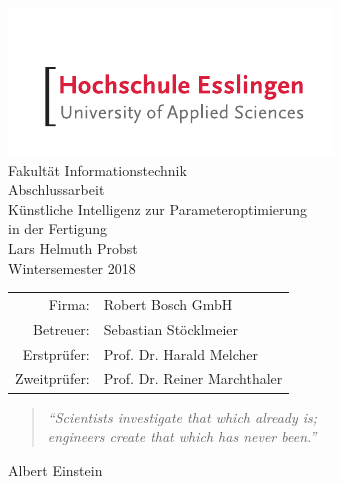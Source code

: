 

\usepackage[T1]{fontenc}
\usepackage[utf8]{inputenc}
\usepackage{graphicx}





\begin{titlepage}
\begin{center}
\includegraphics[scale=2.5]{images/he_logo.pdf}\\
\vspace{1cm} Fakultät Informationstechnik\\
\vspace{1.5cm} \Large Abschlussarbeit \\
\vspace{1.5cm} \Huge Künstliche Intelligenz zur Parameteroptimierung \\in der Fertigung\\
\vspace{1.5cm} \Large Lars Helmuth Probst\\\normalsize
\vspace{0.5cm} Wintersemester 2018\\\normalsize
\vfill{}
\begin{tabular}{rl}
Firma: & Robert Bosch GmbH\\[0.5cm]
Betreuer: & Sebastian Stöcklmeier\\[0.5cm]
Erstprüfer: & Prof. Dr. Harald Melcher\\[0.5cm]
Zweitprüfer: & Prof. Dr. Reiner Marchthaler\\
\end{tabular}
\end{center}
\end{titlepage}

\thispagestyle{empty}
\vspace*{2cm}
\begin{center}
\begin{minipage}{12cm}
\begin{center}
\end{center}
\end{minipage}

\vfill{}

\begin{minipage}{10cm}
\begin{quote}
\textit{"`Scientists investigate that which already is;\\ engineers create that which has never been."'}
\end{quote}
\hfill Albert Einstein
\end{minipage}
\end{center}

